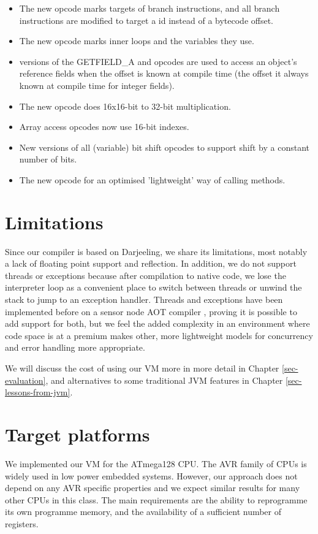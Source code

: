 \begin{itemize}
	\item The new  opcode marks targets of branch instructions, and all branch instructions are modified to target a  id instead of a bytecode offset.
	\item The new  opcode marks inner loops and the variables they use.
	\item {} versions of the {GETFIELD\_A} and  opcodes are used to access an object's reference fields when the offset is known at compile time (the offset it always known at compile time for integer fields).
	\item The new  opcode does 16x16-bit to 32-bit multiplication.
	\item Array access opcodes now use 16-bit indexes.
	\item New  versions of all (variable) bit shift opcodes to support shift by a constant number of bits.
	\item The new  opcode for an optimised 'lightweight' way of calling methods.
\end{itemize}


\section{Limitations}
Since our compiler is based on Darjeeling, we share its limitations, most notably a lack of floating point support and reflection. In addition, we do not support threads or exceptions because after compilation to native code, we lose the interpreter loop as a convenient place to switch between threads or unwind the stack to jump to an exception handler. Threads and exceptions have been implemented before on a sensor node AOT compiler \cite{Ellul:2012thesis}, proving it is possible to add support for both, but we feel the added complexity in an environment where code space is at a premium makes other, more lightweight models for concurrency and error handling more appropriate.

We will discuss the cost of using our VM more in more detail in Chapter \ref{sec-evaluation}, and alternatives to some traditional JVM features in Chapter \ref{sec-lessons-from-jvm}.


\section{Target platforms}
We implemented our VM for the ATmega128 CPU. The AVR family of CPUs is widely used in low power embedded systems. However, our approach does not depend on any AVR specific properties and we expect similar results for many other CPUs in this class. The main requirements are the ability to reprogramme its own programme memory, and the availability of a sufficient number of registers.

